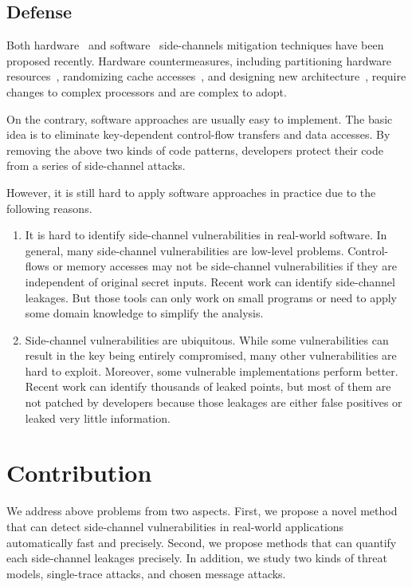 \subsection{Defense}



Both hardware~\cite{Page2005PartitionedCA,
Wang:2007:NCD:1250662.1250723,Zhang:2015:HDL:2775054.2694372,Li:2014:SLH:2541940.2541947,
236344, 236334} and software~\cite{shih2017t,Coppens:2009:PMT:1607723.1608124,
brickell2006software,crane2015thwarting, 197207} side-channels mitigation techniques have
been proposed recently. Hardware countermeasures, including partitioning hardware resources~\cite{Page2005PartitionedCA}, randomizing cache
accesses~\cite{Wang:2007:NCD:1250662.1250723, 236344}, and designing new
architecture~\cite{tiwari2011crafting}, require changes to complex processors and are complex to adopt. 

On the contrary, software approaches are
usually easy to implement. The basic idea is to eliminate key-dependent
control-flow transfers and data accesses. By removing the above two kinds of code patterns, developers protect their 
code from a series of side-channel attacks.


However, it is still hard to apply software approaches in practice due to the following reasons.

\begin{enumerate}
    \item It is hard to identify side-channel vulnerabilities in real-world software. In general, many side-channel vulnerabilities are low-level problems. Control-flows or memory accesses may not be side-channel vulnerabilities if they are independent of original secret inputs. Recent work can identify side-channel leakages. But those tools can only work on small programs or need to apply some domain knowledge to simplify the analysis. 
    \item Side-channel vulnerabilities are ubiquitous. While some vulnerabilities can result in the key being entirely compromised, many other vulnerabilities are hard to exploit. Moreover, some vulnerable implementations perform better. Recent work can identify thousands of leaked points, but most of them are not patched by developers because those leakages are either false positives or leaked very little information.  
\end{enumerate}


\section{Contribution}
We address above problems from two aspects. First, we propose a novel method that can detect side-channel vulnerabilities in real-world applications automatically fast and precisely. Second, we propose methods that can quantify each side-channel leakages precisely. In addition, we study two kinds of threat models, single-trace attacks, and chosen message attacks.

